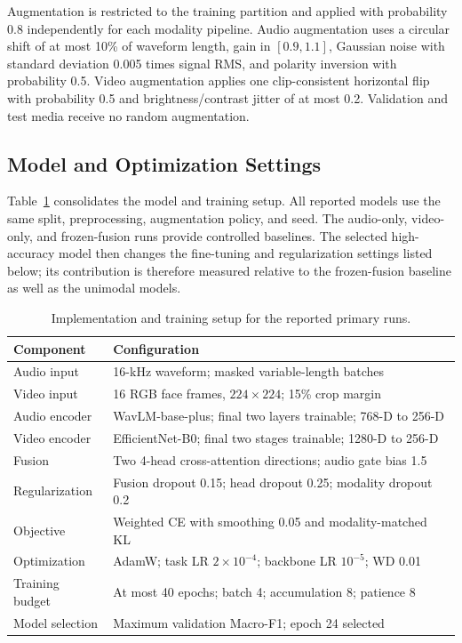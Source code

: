 \documentclass[conference]{IEEEtran}
\begin{document}
Augmentation is restricted to the training partition and applied with
probability 0.8 independently for each modality pipeline. Audio augmentation
uses a circular shift of at most 10\% of waveform length, gain in
$[0.9,1.1]$, Gaussian noise with standard deviation 0.005 times signal RMS,
and polarity inversion with probability 0.5. Video augmentation applies one
clip-consistent horizontal flip with probability 0.5 and brightness/contrast
jitter of at most 0.2. Validation and test media receive no random
augmentation.

\subsection{Model and Optimization Settings}

Table~\ref{tab:setup} consolidates the model and training setup. All reported
models use the same split, preprocessing, augmentation policy, and seed. The
audio-only, video-only, and frozen-fusion runs provide controlled baselines.
The selected high-accuracy model then changes the fine-tuning and regularization
settings listed below; its contribution is therefore measured relative to the
frozen-fusion baseline as well as the unimodal models.

\begin{table}[t]
\centering
\caption{Implementation and training setup for the reported primary runs.}
\label{tab:setup}
\footnotesize
\setlength{\tabcolsep}{4pt}
\renewcommand{\arraystretch}{1.04}
\begin{tabular}{@{}p{}p{}@{}}
\toprule
\textbf{Component} & \textbf{Configuration} \\
\midrule
Audio input
  & 16-kHz waveform; masked variable-length batches \\
Video input
  & 16 RGB face frames, $224\times224$; 15\% crop margin \\
Audio encoder
  & WavLM-base-plus; final two layers trainable; 768-D to 256-D \\
Video encoder
  & EfficientNet-B0; final two stages trainable; 1280-D to 256-D \\
Fusion
  & Two 4-head cross-attention directions; audio gate bias 1.5 \\
Regularization
  & Fusion dropout 0.15; head dropout 0.25; modality dropout 0.2 \\
Objective
  & Weighted CE with smoothing 0.05 and modality-matched KL \\
Optimization
  & AdamW; task LR $2\times10^{-4}$; backbone LR $10^{-5}$; WD 0.01 \\
Training budget
  & At most 40 epochs; batch 4; accumulation 8; patience 8 \\
Model selection
  & Maximum validation Macro-F1; epoch 24 selected \\
\bottomrule
\end{tabular}
\end{table}
\end{document}
